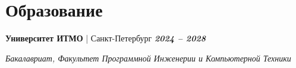 \documentclass[a4paper,10pt]{article}
\newcommand{\entry}[3]{%
  \noindent\textbf{#1} | #2 \hfill \textbf{\textit{#3}} \par
}
\begin{document}
\section*{Образование}
\entry{Университет ИТМО}{Санкт-Петербург}{2024 – 2028}
\textit{Бакалавриат, Факультет Программной Инженерии и Компьютерной Техники}
\end{document}
